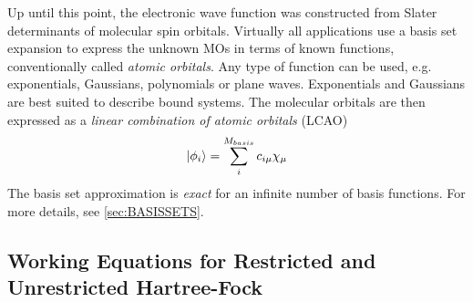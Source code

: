 Up until this point, the electronic wave function was constructed from Slater determinants of molecular spin orbitals. Virtually all applications use a basis set expansion to express the unknown MOs in terms of known functions, conventionally called \emph{atomic orbitals}. Any type of function can be used, e.g. exponentials, Gaussians, polynomials or plane waves. Exponentials and Gaussians are best suited to describe bound systems. The molecular orbitals are then expressed as a \emph{linear combination of atomic orbitals} (LCAO)
\begin{equation}
\ket{\phi_i} = \sum_i^{M_{basis}} c_{i\mu} \chi_{\mu} 
\end{equation}
\noindent The basis set approximation is \emph{exact} for an infinite number of basis functions. For more details, see \ref{sec:BASISSETS}.

\subsection{Working Equations for Restricted and Unrestricted Hartree-Fock}

